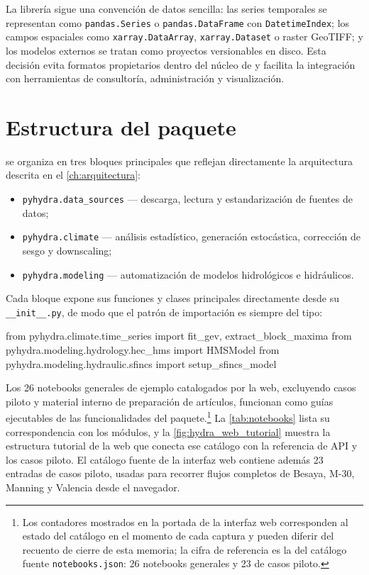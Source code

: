 La librería sigue una convención de datos sencilla: las series temporales se representan como \texttt{pandas.Series} o \texttt{pandas.DataFrame} con \texttt{DatetimeIndex}; los campos espaciales como \texttt{xarray.DataArray}, \texttt{xarray.Dataset} o raster GeoTIFF; y los modelos externos se tratan como proyectos versionables en disco. Esta decisión evita formatos propietarios dentro del núcleo de \pyhydra y facilita la integración con herramientas de consultoría, administración y visualización.

\section{Estructura del paquete}

\pyhydra se organiza en tres bloques principales que reflejan directamente la arquitectura descrita en el \cref{ch:arquitectura}:

\begin{itemize}
  \item \texttt{pyhydra.data\_sources} --- descarga, lectura y estandarización de fuentes de datos;
  \item \texttt{pyhydra.climate} --- análisis estadístico, generación estocástica, corrección de sesgo y downscaling;
  \item \texttt{pyhydra.modeling} --- automatización de modelos hidrológicos e hidráulicos.
\end{itemize}

Cada bloque expone sus funciones y clases principales directamente desde su \texttt{\_\_init\_\_.py}, de modo que el patrón de importación es siempre del tipo:

\begin{codeblock}
from pyhydra.climate.time_series import fit_gev, extract_block_maxima
from pyhydra.modeling.hydrology.hec_hms import HMSModel
from pyhydra.modeling.hydraulic.sfincs import setup_sfincs_model
\end{codeblock}

Los 26 notebooks generales de ejemplo catalogados por la web, excluyendo casos piloto y material interno de preparación de artículos, funcionan como guías ejecutables de las funcionalidades del paquete.\footnote{Los contadores mostrados en la portada de la interfaz web corresponden al estado del catálogo en el momento de cada captura y pueden diferir del recuento de cierre de esta memoria; la cifra de referencia es la del catálogo fuente \texttt{notebooks.json}: 26 notebooks generales y 23 de casos piloto.} La \cref{tab:notebooks} lista su correspondencia con los módulos, y la \cref{fig:hydra_web_tutorial} muestra la estructura tutorial de la web que conecta ese catálogo con la referencia de API y los casos piloto. El catálogo fuente de la interfaz web contiene además 23 entradas de casos piloto, usadas para recorrer flujos completos de Besaya, M-30, Manning y Valencia desde el navegador.

